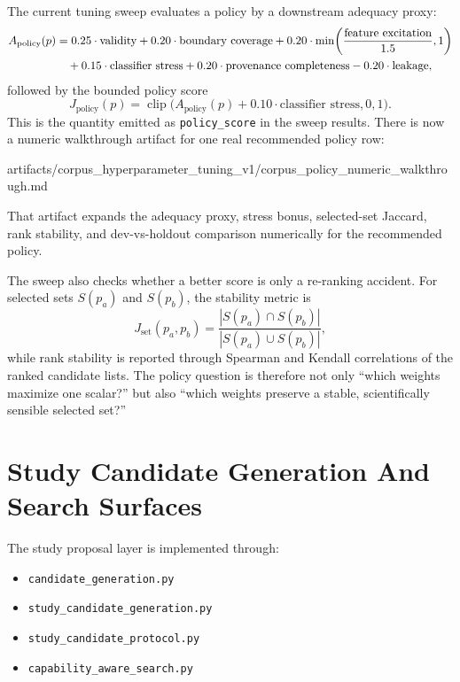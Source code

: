 \documentclass[11pt]{article}
\begin{document}
The current tuning sweep evaluates a policy by a downstream adequacy proxy:
\begin{align}
    A_{\text{policy}}(p)
    &=
    0.25 \cdot \text{validity}
    + 0.20 \cdot \text{boundary coverage}
    + 0.20 \cdot \min\!\left(\frac{\text{feature excitation}}{1.5}, 1\right)
    \notag \\
    &\quad
    + 0.15 \cdot \text{classifier stress}
    + 0.20 \cdot \text{provenance completeness}
    - 0.20 \cdot \text{leakage},
\end{align}
followed by the bounded policy score
\begin{equation}
    J_{\text{policy}}(p)
    =
    \operatorname{clip}
    \big(
        A_{\text{policy}}(p) + 0.10 \cdot \text{classifier stress},
        0,
        1
    \big).
\end{equation}
This is the quantity emitted as \texttt{policy\_score} in the sweep results.
There is now a numeric walkthrough artifact for one real recommended policy row:
\begin{center}
\footnotesize
\begin{minipage}{0.88\textwidth}
\centering
\ttfamily
artifacts/\allowbreak corpus\_hyperparameter\_tuning\_v1/\allowbreak corpus\_policy\_numeric\_walkthrough.md
\end{minipage}
\end{center}
That artifact expands the adequacy proxy, stress bonus, selected-set Jaccard,
rank stability, and dev-vs-holdout comparison numerically for the recommended
policy.

The sweep also checks whether a better score is only a re-ranking accident. For
selected sets \(S(p_a)\) and \(S(p_b)\), the stability metric is
\begin{equation}
    J_{\text{set}}(p_a, p_b)
    =
    \frac{|S(p_a) \cap S(p_b)|}{|S(p_a) \cup S(p_b)|},
\end{equation}
while rank stability is reported through Spearman and Kendall correlations of
the ranked candidate lists. The policy question is therefore not only ``which
weights maximize one scalar?'' but also ``which weights preserve a stable,
scientifically sensible selected set?''

\section{Study Candidate Generation And Search Surfaces}

The study proposal layer is implemented through:
\begin{itemize}[leftmargin=1.5em]
    \item \texttt{candidate\_generation.py}
    \item \texttt{study\_candidate\_generation.py}
    \item \texttt{study\_candidate\_protocol.py}
    \item \texttt{capability\_aware\_search.py}
\end{itemize}
\end{document}
